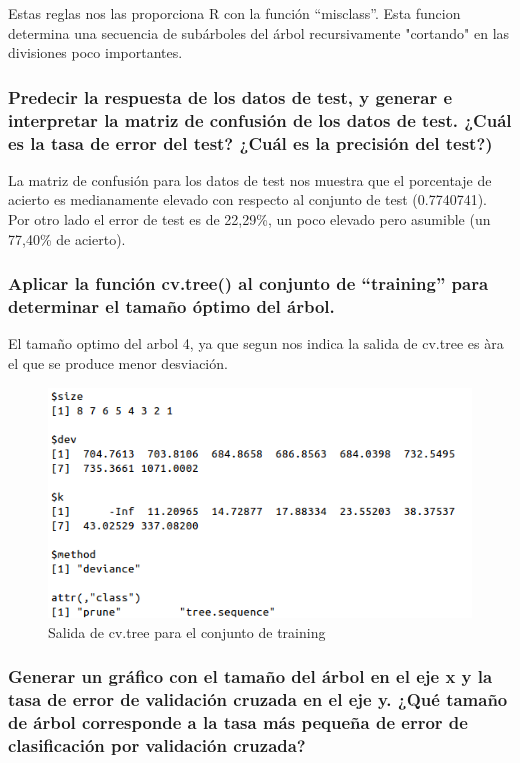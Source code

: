    Estas reglas nos las proporciona R con la función ``misclass''. Esta funcion determina una secuencia de subárboles del árbol recursivamente "cortando" en las divisiones poco importantes.

\subsubsection{Predecir la respuesta de los datos de test, y generar e interpretar la matriz de confusión de los datos de test. ¿Cuál es la tasa de error del test? ¿Cuál es la precisión del test?)}

La matriz de confusión para los datos de test nos muestra que el porcentaje de acierto es medianamente elevado con respecto al conjunto de test (0.7740741). Por otro lado el error de test es de 22,29\%, un poco elevado pero asumible (un 77,40\% de acierto). 

\subsubsection{Aplicar la función cv.tree() al conjunto de “training” para determinar el tamaño óptimo del árbol.}

El tamaño optimo del arbol 4, ya que segun nos indica la salida de cv.tree es àra el que se produce menor desviación.

\begin{figure}[H]
\centering
\includegraphics[scale=0.50]{ej2-5.png}
\caption{Salida de cv.tree para el conjunto de training}
\label{}
\end{figure}

\subsubsection{Generar un gráfico con el tamaño del árbol en el eje x y la tasa de error de validación cruzada en el eje y. ¿Qué tamaño de árbol corresponde a la tasa más pequeña de error de clasificación por validación cruzada?}

